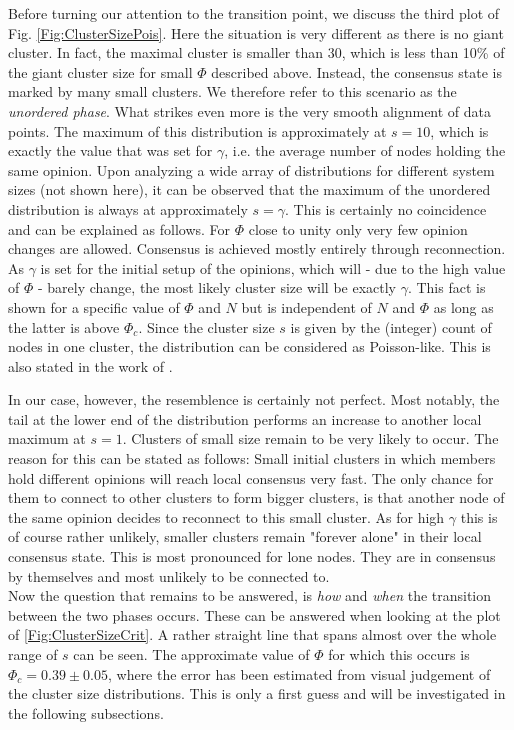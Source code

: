 \documentclass[11pt]{article}
\begin{document}
Before turning our attention to the transition point, we discuss the third plot of Fig. \ref{Fig:ClusterSizePois}. Here the situation is very different as there is no giant cluster. In fact, the maximal cluster is smaller than $30$, which is less than 10\% of the giant cluster size for small $\Phi$ described above. Instead, the consensus state is marked by many small clusters. We therefore refer to this scenario as the \textit{unordered phase}. What strikes even more is the very smooth alignment of data points. The maximum of this distribution is approximately at $s=10$, which is exactly the value that was set for $\gamma$, i.e. the average number of nodes holding the same opinion. Upon analyzing a wide array of distributions for different system sizes (not shown here), it can be observed that the maximum of the unordered distribution is always at approximately $s=\gamma$. This is certainly no coincidence and can be explained as follows. For $\Phi$ close to unity only very few opinion changes are allowed. Consensus is achieved mostly entirely through reconnection. As $\gamma$ is set for the initial setup of the opinions, which will - due to the high value of $\Phi$ - barely change, the most likely cluster size will be exactly $\gamma$. This fact is shown for a specific value of $\Phi$ and $N$ but is independent of $N$ and $\Phi$ as long as the latter is above $\Phi_c$. Since the cluster size $s$ is given by the (integer) count of nodes in one cluster, the distribution can be considered as Poisson-like. This is also stated in the work of \cite{main paper}. 

In our case, however, the resemblence is certainly not perfect. Most notably, the tail at the lower end of the distribution performs an increase to another local maximum at $s=1$. Clusters of small size remain to be very likely to occur. The reason for this can be stated as follows: Small initial clusters in which members hold different opinions will reach local consensus very fast. The only chance for them to connect to other clusters to form bigger clusters, is that another node of the same opinion decides to reconnect to this small cluster. As for high $\gamma$ this is of course rather unlikely, smaller clusters remain "forever alone" in their local consensus state. This is most pronounced for lone nodes. They are in consensus by themselves and most unlikely to be connected to.\\


Now the question that remains to be answered, is \textit{how} and \textit{when} the transition between the two phases occurs. These can be answered when looking at the plot of \ref{Fig:ClusterSizeCrit}. A rather straight line that spans almost over the whole range of $s$ can be seen. The approximate value of $\Phi$ for which this occurs is $\Phi_c=0.39 \pm 0.05$, where the error has been estimated from visual judgement of the cluster size distributions. This is only a first guess and will be investigated in the following subsections. 
\end{document}
